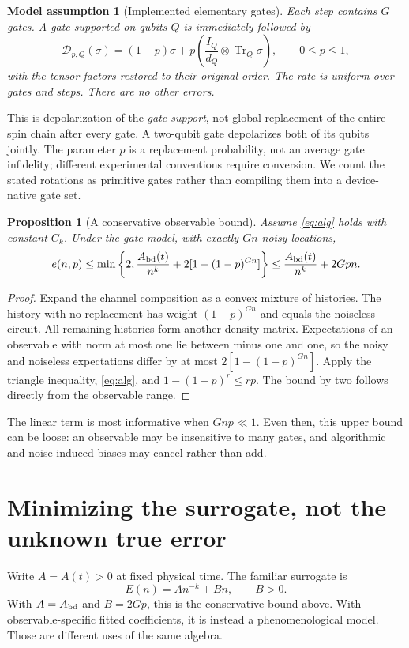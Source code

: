 \documentclass{article}
\newtheorem{proposition}{Proposition}
\newtheorem{assumption}{Model assumption}
\newcommand{\Tr}{\operatorname{Tr}}
\begin{document}
\begin{assumption}[Implemented elementary gates]
Each step contains $G$ gates. A gate supported on qubits $Q$ is immediately followed by
\begin{equation}\label{eq:channel}
 \mathcal D_{p,Q}(\sigma)=(1-p)\sigma+
 p\left(\frac{I_Q}{d_Q}\otimes\Tr_Q\sigma\right),\qquad
 0\leq p\leq1,
\end{equation}
with the tensor factors restored to their original order. The rate is uniform over gates and steps. There are no other errors.
\end{assumption}
This is depolarization of the \emph{gate support}, not global replacement of the entire spin chain after every gate. A two-qubit gate depolarizes both of its qubits jointly. The parameter $p$ is a replacement probability, not an average gate infidelity; different experimental conventions require conversion. We count the stated rotations as primitive gates rather than compiling them into a device-native gate set.

\begin{proposition}[A conservative observable bound]\label{prop:bound}
Assume \eqref{eq:alg} holds with constant $C_k$. Under the gate model, with exactly $Gn$ noisy locations,
\[
 e(n,p)\leq \min\left\{2,\frac{A_{\rm bd}(t)}{n^k}
       +2[1-(1-p)^{Gn}]\right\}
 \leq \frac{A_{\rm bd}(t)}{n^k}+2 Gpn.
\]
\end{proposition}
\begin{proof}
Expand the channel composition as a convex mixture of histories. The history with no replacement has weight $(1-p)^{Gn}$ and equals the noiseless circuit. All remaining histories form another density matrix. Expectations of an observable with norm at most one lie between minus one and one, so the noisy and noiseless expectations differ by at most $2[1-(1-p)^{Gn}]$. Apply the triangle inequality, \eqref{eq:alg}, and $1-(1-p)^r\leq rp$. The bound by two follows directly from the observable range.
\end{proof}
The linear term is most informative when $Gnp\ll1$. Even then, this upper bound can be loose: an observable may be insensitive to many gates, and algorithmic and noise-induced biases may cancel rather than add.

\section{Minimizing the surrogate, not the unknown true error}
Write $A=A(t)>0$ at fixed physical time. The familiar surrogate is
\begin{equation}\label{eq:surrogate}
 E(n)=A n^{-k}+Bn,\qquad B>0.
\end{equation}
With $A=A_{\rm bd}$ and $B=2 Gp$, this is the conservative bound above. With observable-specific fitted coefficients, it is instead a phenomenological model. Those are different uses of the same algebra.
\end{document}
